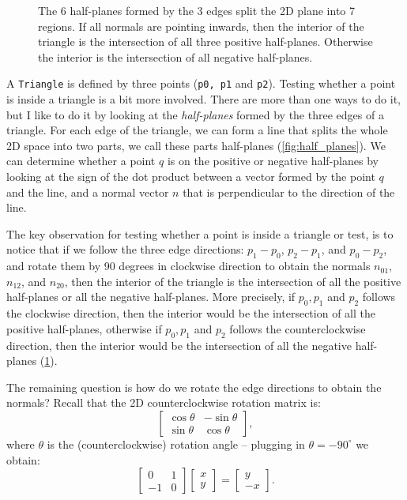 \begin{figure}[t]
\begin{minipage}{0.39\linewidth}
    \caption{The 6 half-planes formed by the 3 edges split the 2D plane into 7 regions. If all normals are pointing inwards, then the interior of the triangle is the intersection of all three positive half-planes. Otherwise the interior is the intersection of all negative half-planes.}
    \label{fig:tri_half_planes}
    \end{minipage}
\end{figure}

A \lstinline{Triangle} is defined by three points (\lstinline{p0, p1} and \lstinline{p2}). Testing whether a point is inside a triangle is a bit more involved. There are more than one ways to do it, but I like to do it by looking at the \emph{half-planes} formed by the three edges of a triangle. For each edge of the triangle, we can form a line that splits the whole 2D space into two parts, we call these parts half-planes (\cref{fig:half_planes}). We can determine whether a point $q$ is on the positive or negative half-planes by looking at the sign of the dot product between a vector formed by the point $q$ and the line, and a normal vector $n$ that is perpendicular to the direction of the line. 

The key observation for testing whether a point is inside a triangle or test, is to notice that if we follow the three edge directions: $p_1 - p_0$, $p_2 - p_1$, and $p_0 - p_2$, and rotate them by 90 degrees in clockwise direction to obtain the normals $n_{01}$, $n_{12}$, and $n_{20}$, then the interior of the triangle is the intersection of all the positive half-planes or all the negative half-planes. More precisely, if $p_0, p_1$ and $p_2$ follows the clockwise direction, then the interior would be the intersection of all the positive half-planes, otherwise if $p_0, p_1$ and $p_2$ follows the counterclockwise direction, then the interior would be the intersection of all the negative half-planes (\cref{fig:tri_half_planes}).

The remaining question is how do we rotate the edge directions to obtain the normals? Recall that the 2D counterclockwise rotation matrix is:
\begin{equation}
\begin{bmatrix}
\cos \theta & -\sin \theta \\
\sin \theta & \cos \theta
\end{bmatrix},
\end{equation}
where $\theta$ is the (counterclockwise) rotation angle -- plugging in $\theta = -90^{\circ}$ we obtain:
\begin{equation}
\begin{bmatrix}
0 & 1 \\
-1 & 0
\end{bmatrix}
\begin{bmatrix}
x \\ y
\end{bmatrix}
=
\begin{bmatrix}
y \\ -x
\end{bmatrix}.
\end{equation}

